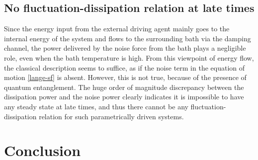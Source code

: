 \documentclass[11pt,a4paper]{article}
\begin{document}
\subsection{No fluctuation-dissipation relation at late times}

Since the energy input from the external driving agent mainly goes to the internal energy of the system and flows to the surrounding bath via the damping channel, the power delivered by the noise force from the bath plays a negligible role, even when the bath temperature is high. From this viewpoint of energy flow, the classical description seems to suffice, as if the noise term in the equation of motion \eqref{lange-sf} is absent. However, this is not true, because of the presence of quantum entanglement. The huge order of magnitude discrepancy between the dissipation power and the noise power clearly indicates it is impossible to have any steady state at late times, and thus there cannot be any fluctuation-dissipation relation for such parametrically driven systems.








\section{Conclusion}
\end{document}
